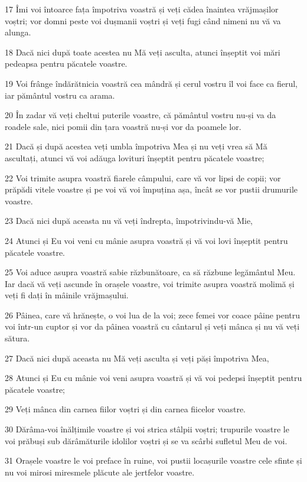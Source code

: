 \par 17 Îmi voi întoarce fața împotriva voastră și veți cădea înaintea vrăjmașilor voștri; vor domni peste voi dușmanii voștri și veți fugi când nimeni nu vă va alunga.
\par 18 Dacă nici după toate acestea nu Mă veți asculta, atunci înșeptit voi mări pedeapsa pentru păcatele voastre.
\par 19 Voi frânge îndărătnicia voastră cea mândră și cerul vostru îl voi face ca fierul, iar pământul vostru ca arama.
\par 20 În zadar vă veți cheltui puterile voastre, că pământul vostru nu-și va da roadele sale, nici pomii din țara voastră nu-și vor da poamele lor.
\par 21 Dacă și după acestea veți umbla împotriva Mea și nu veți vrea să Mă ascultați, atunci vă voi adăuga lovituri înșeptit pentru păcatele voastre;
\par 22 Voi trimite asupra voastră fiarele câmpului, care vă vor lipsi de copii; vor prăpădi vitele voastre și pe voi vă voi împuțina așa, încât se vor pustii drumurile voastre.
\par 23 Dacă nici după aceasta nu vă veți îndrepta, împotrivindu-vă Mie,
\par 24 Atunci și Eu voi veni cu mânie asupra voastră și vă voi lovi înșeptit pentru păcatele voastre.
\par 25 Voi aduce asupra voastră sabie răzbunătoare, ca să răzbune legământul Meu. Iar dacă vă veți ascunde în orașele voastre, voi trimite asupra voastră molimă și veți fi dați în mâinile vrăjmașului.
\par 26 Pâinea, care vă hrănește, o voi lua de la voi; zece femei vor coace pâine pentru voi într-un cuptor și vor da pâinea voastră cu cântarul și veți mânca și nu vă veți sătura.
\par 27 Dacă nici după aceasta nu Mă veți asculta și veți păși împotriva Mea,
\par 28 Atunci și Eu cu mânie voi veni asupra voastră și vă voi pedepsi înșeptit pentru păcatele voastre;
\par 29 Veți mânca din carnea fiilor voștri și din carnea fiicelor voastre.
\par 30 Dărâma-voi înălțimile voastre și voi strica stâlpii voștri; trupurile voastre le voi prăbuși sub dărâmăturile idolilor voștri și se va scârbi sufletul Meu de voi.
\par 31 Orașele voastre le voi preface în ruine, voi pustii locașurile voastre cele sfinte și nu voi mirosi miresmele plăcute ale jertfelor voastre.
